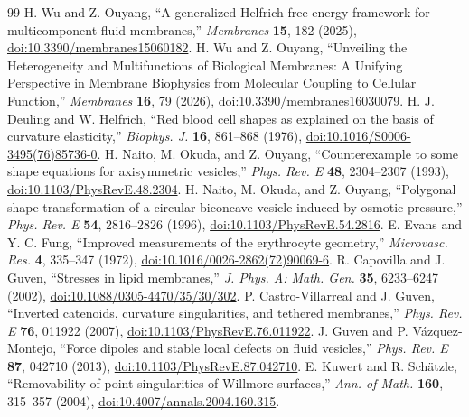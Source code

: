 \documentclass[preprint,amsmath,amssymb,aps,prl,superscriptaddress,nofootinbib,floatfix]{revtex4-2}
\begin{document}
\begin{thebibliography}{99}
 H. Wu and Z. Ouyang, ``A generalized Helfrich free energy framework for multicomponent fluid membranes,'' \emph{Membranes} \textbf{15}, 182 (2025), \href{https://doi.org/10.3390/membranes15060182}{doi:10.3390/membranes15060182}.
 H. Wu and Z. Ouyang, ``Unveiling the Heterogeneity and Multifunctions of Biological Membranes: A Unifying Perspective in Membrane Biophysics from Molecular Coupling to Cellular Function,'' \emph{Membranes} \textbf{16}, 79 (2026), \href{https://doi.org/10.3390/membranes16030079}{doi:10.3390/membranes16030079}.
 H. J. Deuling and W. Helfrich, ``Red blood cell shapes as explained on the basis of curvature elasticity,'' \emph{Biophys. J.} \textbf{16}, 861--868 (1976), \href{https://doi.org/10.1016/S0006-3495(76)85736-0}{doi:10.1016/S0006-3495(76)85736-0}.
 H. Naito, M. Okuda, and Z. Ouyang, ``Counterexample to some shape equations for axisymmetric vesicles,'' \emph{Phys. Rev. E} \textbf{48}, 2304--2307 (1993), \href{https://doi.org/10.1103/PhysRevE.48.2304}{doi:10.1103/PhysRevE.48.2304}.
 H. Naito, M. Okuda, and Z. Ouyang, ``Polygonal shape transformation of a circular biconcave vesicle induced by osmotic pressure,'' \emph{Phys. Rev. E} \textbf{54}, 2816--2826 (1996), \href{https://doi.org/10.1103/PhysRevE.54.2816}{doi:10.1103/PhysRevE.54.2816}.
 E. Evans and Y. C. Fung, ``Improved measurements of the erythrocyte geometry,'' \emph{Microvasc. Res.} \textbf{4}, 335--347 (1972), \href{https://doi.org/10.1016/0026-2862(72)90069-6}{doi:10.1016/0026-2862(72)90069-6}.
 R. Capovilla and J. Guven, ``Stresses in lipid membranes,'' \emph{J. Phys. A: Math. Gen.} \textbf{35}, 6233--6247 (2002), \href{https://doi.org/10.1088/0305-4470/35/30/302}{doi:10.1088/0305-4470/35/30/302}.
 P. Castro-Villarreal and J. Guven, ``Inverted catenoids, curvature singularities, and tethered membranes,'' \emph{Phys. Rev. E} \textbf{76}, 011922 (2007), \href{https://doi.org/10.1103/PhysRevE.76.011922}{doi:10.1103/PhysRevE.76.011922}.
 J. Guven and P. V\'azquez-Montejo, ``Force dipoles and stable local defects on fluid vesicles,'' \emph{Phys. Rev. E} \textbf{87}, 042710 (2013), \href{https://doi.org/10.1103/PhysRevE.87.042710}{doi:10.1103/PhysRevE.87.042710}.
 E. Kuwert and R. Sch\"atzle, ``Removability of point singularities of Willmore surfaces,'' \emph{Ann. of Math.} \textbf{160}, 315--357 (2004), \href{https://doi.org/10.4007/annals.2004.160.315}{doi:10.4007/annals.2004.160.315}.

\end{thebibliography}
\end{document}
